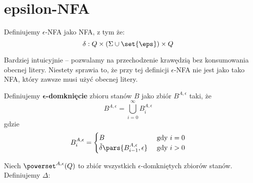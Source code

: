 \newpage
\section{epsilon-NFA}
\begin{definition}
    Definiujemy \( \epsilon \)-NFA jako NFA, z tym że:
    \[
        \delta: Q \times (\Sigma \cup \set{\eps}) \times Q
    \]
\end{definition}
Bardziej intuicyjnie -- pozwalamy na przechodzenie krawędzią bez konsumowania obecnej litery.
Niestety sprawia to, że przy tej definicji \( \epsilon \)-NFA nie jest jako tako NFA, który zawsze musi użyć obecnej litery.

\begin{definition}
    Definiujemy \(\mathbf{\epsilon}\)\textbf{-domknięcie} zbioru stanów \( B \) jako zbiór \( B^{A, \epsilon} \) taki, że
    \[
        B^{A, \epsilon} = \bigcup_{i=0}^\infty B_i^{A, \epsilon}
    \]
    gdzie
    \[
        B_i^{A, \epsilon} = \begin{cases}
            B & \text{ gdy } i = 0 \\
            \tilde \delta\pars{B_{i-1}^{A, \epsilon}, \epsilon} & \text{ gdy } i > 0
        \end{cases}
    \]
\end{definition}
\begin{definition}
    Niech \(\powerset^{A, \epsilon}(Q) \) to zbiór wszystkich \(\epsilon\)-domkniętych zbiorów stanów.
    Definiujemy \( \Delta :  \)
\end{definition}

